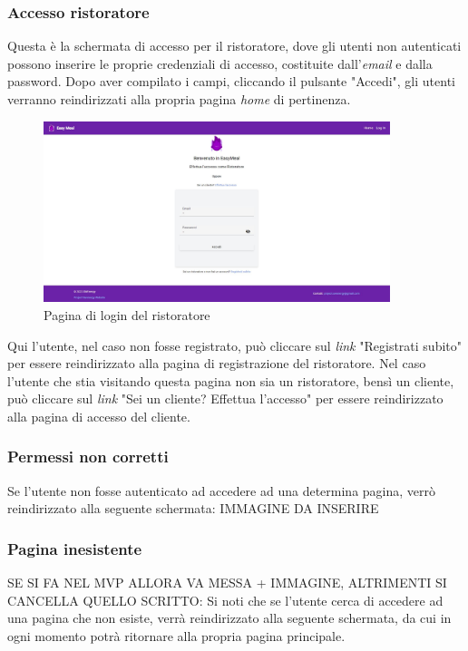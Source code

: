 \subsubsection{Accesso ristoratore}
Questa è la schermata di accesso per il ristoratore, dove gli utenti non autenticati possono inserire le proprie credenziali di accesso, costituite dall'\textit{email} e dalla {password}. 
Dopo aver compilato i campi, cliccando il pulsante "Accedi", gli utenti verranno reindirizzati alla propria pagina \textit{home} di pertinenza.

\newpage
\begin{figure}[h]
    \centering
    \includegraphics[width=0.9\textwidth]{./img/loginRistoratore.jpg}
    \caption{Pagina di login del ristoratore}
    \label{fig:esempio}
\end{figure}

Qui l'utente, nel caso non fosse registrato, può cliccare sul \textit{link} "Registrati subito" per essere reindirizzato alla pagina di registrazione del ristoratore.
Nel caso l'utente che stia visitando questa pagina non sia un ristoratore, bensì un cliente, può cliccare sul \textit{link} "Sei un cliente? Effettua l'accesso" 
per essere reindirizzato alla pagina di accesso del cliente.

\subsubsection{Permessi non corretti}
Se l'utente non fosse autenticato ad accedere ad una determina pagina, verrò reindirizzato alla seguente schermata:
IMMAGINE DA INSERIRE

\subsubsection{Pagina inesistente}
SE SI FA NEL MVP ALLORA VA MESSA + IMMAGINE, ALTRIMENTI SI CANCELLA QUELLO SCRITTO:
Si noti che se l'utente cerca di accedere ad una pagina che non esiste, verrà reindirizzato alla
seguente schermata, da cui in ogni momento potrà ritornare alla propria pagina principale.

